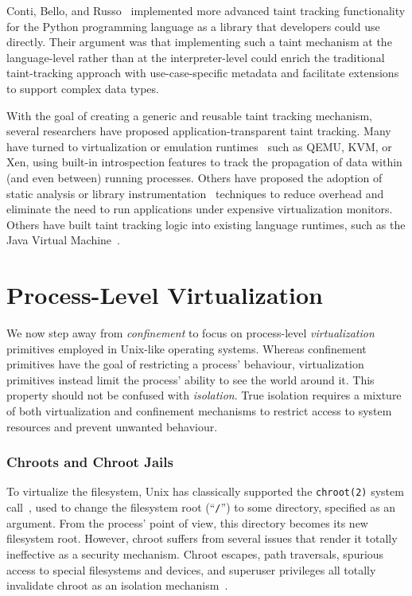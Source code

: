 \documentclass[
  fontsize=12pt,
  titlepage=firstiscover,
  paper=letter,
oneside,
  cleardoublepage=plain,
  parskip=half-,
  DIV=10,
  parindent,
  appendixprefix,
  chapterprefix,
  listof=totoc,
]{scrbook}
\begin{document}
Conti, Bello, and Russo~\cite{conti2010_taint, bello2012_taint} implemented more advanced
taint tracking functionality for the Python programming language as a library that
developers could use directly. Their argument was that implementing such a taint mechanism
at the language-level rather than at the interpreter-level could enrich the traditional
taint-tracking approach with use-case-specific metadata and facilitate extensions to
support complex data types.

With the goal of creating a generic and reusable taint tracking mechanism, several
researchers have proposed application-transparent taint tracking. Many have turned to
virtualization or emulation runtimes~\cite{ermolinskiy2010_towards, zavou2011_taint,
yin2007_panorama} such as QEMU, KVM, or Xen, using built-in introspection features to
track the propagation of data within (and even between) running processes. Others have
proposed the adoption of static analysis or library
instrumentation~\cite{zhu2011_taint_eraser, cheng2006_taint, clause2007_taint} techniques
to reduce overhead and eliminate the need to run applications under expensive
virtualization monitors. Others have built taint tracking logic into existing language
runtimes, such as the Java Virtual Machine~\cite{chin2009_efficient}.



\section{Process-Level Virtualization}\label{s:virtualization}

We now step away from \textit{confinement} to focus on process-level
\textit{virtualization} primitives employed in Unix-like operating systems. Whereas
confinement primitives have the goal of restricting a process' behaviour, virtualization
primitives instead limit the process' ability to see the world around it. This property
should not be confused with \textit{isolation}. True isolation requires a mixture of both
virtualization and confinement mechanisms to restrict access to system resources and
prevent unwanted behaviour.

\subsubsection*{Chroots and Chroot Jails}

To virtualize the filesystem, Unix has classically supported the \texttt{chroot(2)} system
call~\cite{mcfearin2011_chroot_jails}, used to change the filesystem root (\enquote{\texttt{/}})
to some directory, specified as an argument. From the process' point of view, this
directory becomes its new filesystem root. However, chroot suffers from several issues
that render it totally ineffective as a security mechanism. Chroot escapes, path
traversals, spurious access to special filesystems and devices, and superuser privileges
all totally invalidate chroot as an isolation mechanism~\cite{mcfearin2011_chroot_jails}.
\end{document}
